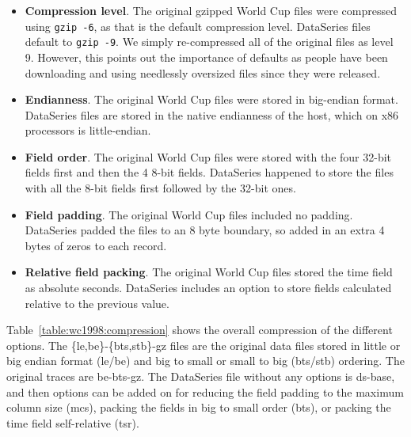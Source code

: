 \begin{itemize}

\item {\bf Compression level}.  The original gzipped World Cup files were
compressed using {\tt gzip -6}, as that is the default compression
level.  DataSeries files default to {\tt gzip -9}.  We simply
re-compressed all of the original files as level 9.  However, this
points out the importance of defaults as people have been downloading
and using needlessly oversized files since they were released.

\item {\bf Endianness}.  The original World Cup files were stored 
in big-endian format.  DataSeries files are stored in the native
endianness of the host, which on x86 processors is little-endian.

\item {\bf Field order}.  The original World Cup files were stored
with the four 32-bit fields first and then the 4 8-bit fields.
DataSeries happened to store the files with all the 8-bit fields first
followed by the 32-bit ones.

\item {\bf Field padding}.  The original World Cup files included
no padding.  DataSeries padded the files to an 8 byte boundary, so
added in an extra 4 bytes of zeros to each record.

\item {\bf Relative field packing}.  The original World Cup files stored
the time field as absolute seconds.  DataSeries includes an option to
store fields calculated relative to the previous value.

\end{itemize}

Table~\ref{table:wc1998:compression} shows the overall compression of
the different options.  The \{le,be\}-\{bts,stb\}-gz files are the
original data files stored in little or big endian format (le/be) and
big to small or small to big (bts/stb) ordering.  The original traces
are be-bts-gz.  The DataSeries file without any options is ds-base,
and then options can be added on for reducing the field padding to the
maximum column size (mcs), packing the fields in big to small order
(bts), or packing the time field self-relative (tsr).


